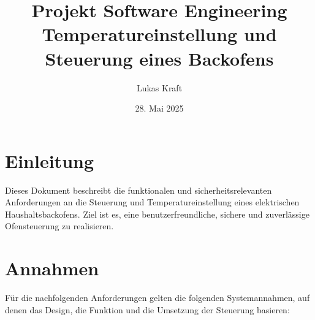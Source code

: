 \documentclass[a4paper,12pt]{article}
\begin{document}
\title{Projekt Software Engineering
 Temperatureinstellung und Steuerung eines Backofens}
\author{Lukas Kraft}
\date{28. Mai 2025}

\maketitle

\newpage

\section*{Einleitung}

Dieses Dokument beschreibt die funktionalen und sicherheitsrelevanten Anforderungen an die Steuerung und Temperatureinstellung eines elektrischen Haushaltsbackofens. Ziel ist es, eine benutzerfreundliche, sichere und zuverlässige Ofensteuerung zu realisieren.

\newpage

\section{Annahmen}

Für die nachfolgenden Anforderungen gelten die folgenden Systemannahmen, auf denen das Design, die Funktion und die Umsetzung der Steuerung basieren:
\end{document}

